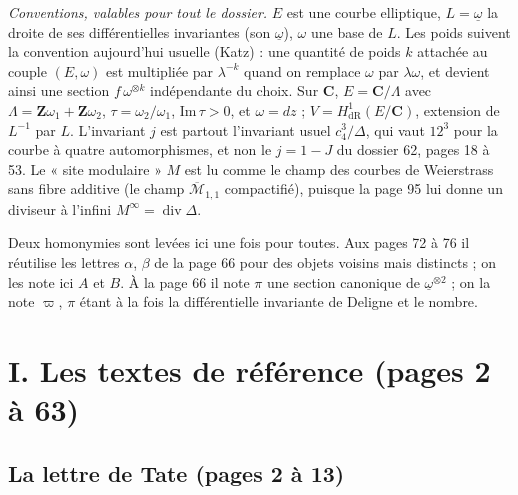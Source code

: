 \documentclass[11pt,a4paper]{article}
\begin{document}
\emph{Conventions, valables pour tout le dossier.} $E$ est une courbe
elliptique, $L = \underline{\omega}$ la droite de ses différentielles
invariantes (son $\underline{\omega}$), $\omega$ une base de $L$. Les poids
suivent la convention aujourd'hui usuelle (Katz) : une quantité de poids $k$
attachée au couple $(E,\omega)$ est multipliée par $\lambda^{-k}$ quand on
remplace $\omega$ par $\lambda\omega$, et devient ainsi une section
$f\,\omega^{\otimes k}$ indépendante du choix. Sur $\mathbf{C}$, $E =
\mathbf{C}/\Lambda$ avec $\Lambda = \mathbf{Z}\omega_1 + \mathbf{Z}\omega_2$,
$\tau = \omega_2/\omega_1$, $\mathrm{Im}\,\tau > 0$, et $\omega = dz$ ;
$V = H^1_{\mathrm{dR}}(E/\mathbf{C})$, extension de $L^{-1}$ par $L$. L'invariant
$j$ est partout l'invariant usuel $c_4^3/\Delta$, qui vaut $12^3$ pour la courbe
à quatre automorphismes, et non le $j = 1 - J$ du dossier 62, pages 18 à 53. Le
« site modulaire » $M$ est lu comme le champ des courbes de Weierstrass sans
fibre additive (le champ $\overline{\mathcal{M}}_{1,1}$ compactifié), puisque
la page 95 lui donne un diviseur à l'infini $M^{\infty} = \operatorname{div}
\Delta$.

Deux homonymies sont levées ici une fois pour toutes. Aux pages 72 à 76 il
réutilise les lettres $\alpha$, $\beta$ de la page 66 pour des objets voisins
mais distincts ; on les note ici $A$ et $B$. À la page 66 il note $\pi$ une
section canonique de $\underline{\omega}^{\otimes 2}$ ; on la note $\varpi$,
$\pi$ étant à la fois la différentielle invariante de Deligne et le nombre.

\section*{I. Les textes de référence (pages 2 à 63)}

\subsection*{La lettre de Tate (pages 2 à 13)}
\end{document}
